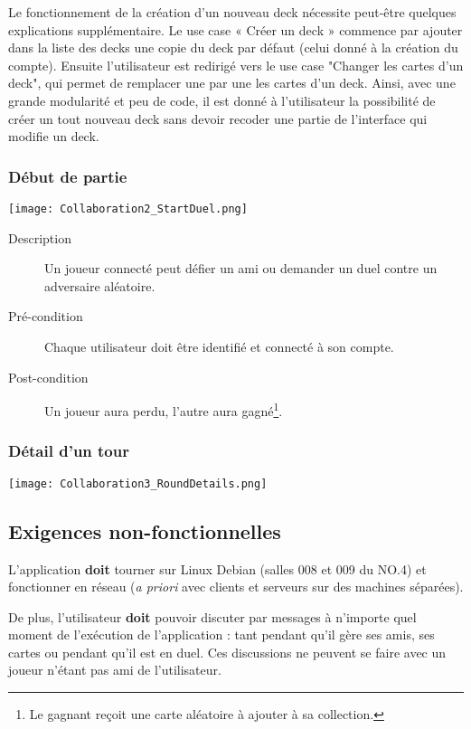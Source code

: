 \documentclass[12pt]{article}
\begin{document}
			Le fonctionnement de la création d'un nouveau \gls{deck} nécessite peut-être quelques explications
			supplémentaire. 
			Le use case « Créer un \gls{deck} » commence par ajouter dans la liste des \glspl{deck}
			une copie du \gls{deck} par défaut (celui donné à la création du compte). Ensuite l'utilisateur
			est redirigé vers le use case "Changer les cartes d'un \gls{deck}", qui permet de remplacer
			une par une les cartes d'un \gls{deck}. 
			Ainsi, avec une grande modularité et peu de code,
			il est donné à l'utilisateur la possibilité de créer un tout nouveau \gls{deck} sans devoir recoder une partie
			de l'interface qui modifie un \gls{deck}.

		\subsubsection{Début de partie}
			\begin{center}\texttt{[image: Collaboration2\_StartDuel.png]}\end{center}

			\begin{description}
				\item[Description] Un joueur connecté peut défier un ami ou demander un \gls{duel} contre un adversaire aléatoire.
				\item[Pré-condition] Chaque utilisateur doit être identifié et connecté à son compte.
				\item[Post-condition] Un joueur aura perdu, l'autre aura gagné\footnote{Le gagnant reçoit une carte aléatoire à ajouter à sa collection.}.
			\end{description}

		\subsubsection{Détail d'un tour}
			\begin{center}\texttt{[image: Collaboration3\_RoundDetails.png]}\end{center}

	\subsection{Exigences non-fonctionnelles}
		L'application \textbf{doit} tourner sur Linux Debian (salles 008 et 009 du NO.4) et fonctionner en réseau (\textit{a priori} avec clients
		et serveurs sur des machines séparées).

		De plus, l'utilisateur \textbf{doit} pouvoir discuter par messages à n'importe quel moment de l'exécution de l'application : tant pendant
		qu'il gère ses amis, ses cartes ou pendant qu'il est en \gls{duel}. Ces discussions ne peuvent se faire avec un joueur
		n'étant pas ami de l'utilisateur.
\end{document}
